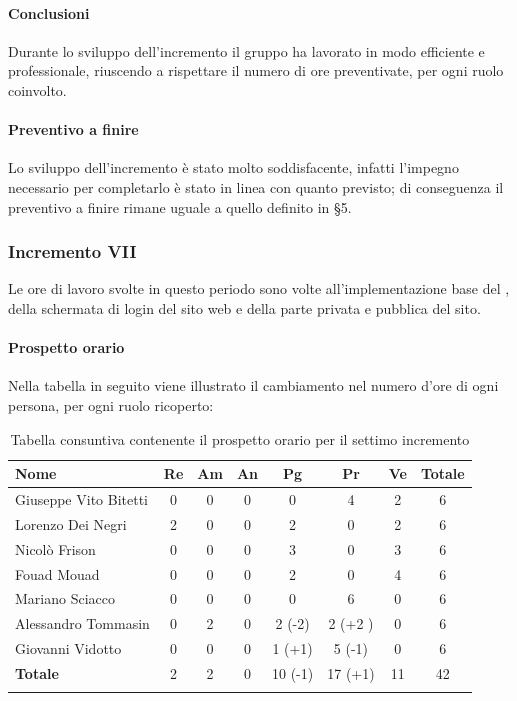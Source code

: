 			\paragraph{Conclusioni}
				Durante lo sviluppo dell'incremento il gruppo ha lavorato in modo efficiente e professionale, riuscendo a rispettare il numero di ore preventivate, per ogni ruolo coinvolto. 
			
			\paragraph{Preventivo a finire}
				Lo sviluppo dell'incremento è stato molto soddisfacente, infatti l'impegno necessario per completarlo è stato in linea con quanto previsto; di conseguenza il preventivo a finire rimane uguale a quello definito in \S5.
			\pagebreak
		
		\subsubsection{Incremento VII}
			Le ore di lavoro svolte in questo periodo sono volte all'implementazione base del , della schermata di login del sito web e della parte privata e pubblica del sito.
			\paragraph{Prospetto orario}
			Nella tabella in seguito viene illustrato il cambiamento nel numero d'ore di ogni persona, per ogni ruolo ricoperto:
		
			\begin{longtable}{|l|c|c|c|c|c|c|c|}
				\hline
				\rowcolor{lighter-grayer}
				\textbf{Nome} & \textbf{Re} & \textbf{Am} & \textbf{An} & \textbf{Pg}  & \textbf{Pr}   & \textbf{Ve} & \textbf{Totale} \\
				\hline
				\endfirsthead
				
				\hline
				Giuseppe Vito Bitetti 		 & 0 & 0 & 0 & 0 & 4 & 2 & 6\\
				\hline
				\hline
				Lorenzo Dei Negri			 & 2 & 0 & 0 & 2 & 0 & 2 & 6\\
				\hline
				\hline
				Nicolò Frison				      & 0 & 0 & 0 & 3 & 0 & 3 & 6\\
				\hline
				\hline
				Fouad Mouad 				   & 0 & 0 & 0 & 2 & 0 & 4 & 6\\
				\hline
				\hline
				Mariano Sciacco 			 & 0 & 0 & 0 & 0 & 6 & 0 & 6\\
				\hline
				\hline
				Alessandro Tommasin    & 0 & 2 & 0 & 2 (-2) & 2 (+2 )& 0 & 6\\
				\hline
				\hline
				Giovanni Vidotto 			  & 0 & 0 & 0 & 1 (+1) & 5 (-1) & 0 & 6\\
				\hline 
				\textbf{Totale}			 		& 2 & 2 & 0 & 10 (-1) & 17 (+1) & 11 & 42\\
				\hline
				\caption{Tabella consuntiva contenente il prospetto orario per il settimo incremento}
			\end{longtable}
		
